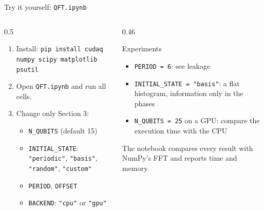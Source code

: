 \documentclass[aspectratio=169,11pt]{beamer}
\begin{document}
\begin{frame}{Try it yourself: \texttt{QFT.ipynb}}
  \begin{columns}[T]
    \begin{column}{0.5\textwidth}
      \begin{enumerate}
        \item Install: \texttt{pip install cudaq numpy scipy matplotlib psutil}
        \item Open \texttt{QFT.ipynb} and run all cells.
        \item Change only Section 3:
          \begin{itemize}
            \item \texttt{N\_QUBITS} (default 15)
            \item \texttt{INITIAL\_STATE}: \texttt{"periodic"}, \texttt{"basis"}, \texttt{"random"}, \texttt{"custom"}
            \item \texttt{PERIOD}, \texttt{OFFSET}
            \item \texttt{BACKEND}: \texttt{"cpu"} or \texttt{"gpu"}
          \end{itemize}
      \end{enumerate}
    \end{column}
    \begin{column}{0.46\textwidth}
      \begin{block}{Experiments}
        \begin{itemize}
          \item \texttt{PERIOD = 6}: see leakage
          \item \texttt{INITIAL\_STATE = "basis"}: a flat histogram, information only in the phases
          \item \texttt{N\_QUBITS = 25} on a GPU: compare the execution time with the CPU
        \end{itemize}
      \end{block}
      The notebook compares every result with NumPy's FFT and reports time and memory.
    \end{column}
  \end{columns}
\end{frame}

\end{document}
